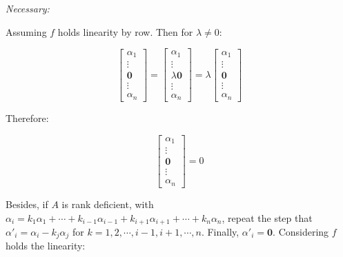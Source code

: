 \documentclass{article}
\begin{document}
\vspace{2mm}
\textit{Necessary:}

Assuming \(f\) holds linearity by row. Then for \(\lambda \neq 0\):

\begin{equation}
\begin{bmatrix}
    \alpha_1 \\
    \vdots \\
    \mathbf{0} \\
    \vdots \\
    \alpha_n
\end{bmatrix} = 
\begin{bmatrix}
    \alpha_1 \\
    \vdots \\
    \lambda \mathbf{0} \\
    \vdots \\
    \alpha_n
\end{bmatrix} = 
\lambda\begin{bmatrix}
    \alpha_1 \\
    \vdots \\
    \mathbf{0} \\
    \vdots \\
    \alpha_n
\end{bmatrix}
\end{equation}

Therefore:

\begin{equation}
\begin{bmatrix}
    \alpha_1 \\
    \vdots \\
    \mathbf{0} \\
    \vdots \\
    \alpha_n
\end{bmatrix} = 0
\end{equation}

Besides, if \(A\) is rank deficient, with \(\alpha_i = k_1\alpha_1 + \cdots +
k_{i-1}\alpha_{i-1} + k_{i+1}\alpha_{i+1} + \cdots + k_n\alpha_n\),
repeat the step that \(\alpha'_i=\alpha_i - k_j \alpha_{j}\) for
\(k = 1, 2, \cdots, i-1, i+1, \cdots, n\). Finally, \(\alpha'_i=\mathbf{0}\).
Considering \(f\) holds the linearity:
\end{document}
